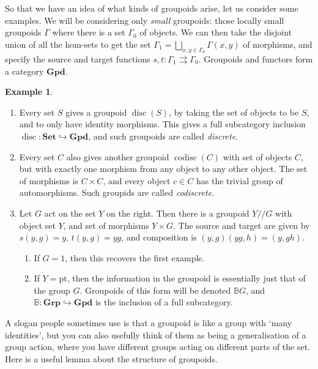 \documentclass{tufte-handout}
\def\into {\hookrightarrow}
\def\pt {\mathrm{pt}}
\def\Set {\mathbf{Set}}
\def\Grp {\mathbf{Grp}}
\def\Gpd {\mathbf{Gpd}}
\def\BB{\mathbb{B}}
\DeclareMathOperator{\disc}{disc}
\DeclareMathOperator{\codisc}{codisc}
\theoremstyle{definition}
\newtheorem{example}{Example}
\begin{document}
So that we have an idea of what kinds of groupoids arise, let us consider some examples. 
We will be considering only \emph{small} groupoids: those locally small groupoids 
$\Gamma$ where there is a set $\Gamma_0$ of objects. We can then take the disjoint union 
of all the hom-sets to get the set $\Gamma_1= \bigsqcup_{x,y\in \Gamma_0} \Gamma(x,y)$ of morphisms, and specify the source and 
target functions $s,t\colon \Gamma_1\rightrightarrows \Gamma_0$. Groupoids and functors 
form a category $\Gpd$.

\begin{example}
\begin{enumerate}
\item Every set $S$ gives a groupoid $\disc(S)$, by taking the set of objects to be $S$, and to only have identity
morphisms. This gives a full subcategory inclusion $\disc\colon \Set \into \Gpd$, and such groupoids are called \emph{discrete}.
\item Every set $C$ also gives another groupoid $\codisc(C)$ with set of objects $C$, but with exactly 
one morphism from any object to any other object. The set of morphisms is $C\times C$, and every 
object $c\in C$ has the trivial group of automorphisms. Such groupids are called \emph{codiscrete}.
\item Let $G$ act on the set $Y$ on the right. Then there is a groupoid $Y/\!/G$ with object set $Y$, and set of 
morphisms $Y\times G$. The source and target are given by $s(y,g)=y$, $t(y,g)=yg$, and composition is $(y,g)(yg,h) = (y,gh)$.
\begin{enumerate}
\item If $G=1$, then this recovers the first example.
\item If $Y=\pt$, then the information in the groupoid is essentially just that of the group $G$. Groupoids of this form will be denoted $\BB G$, and $\BB\colon \Grp \into \Gpd$ is the inclusion of a full subcategory.
\end{enumerate}
\end{enumerate}
\end{example}

A slogan people sometimes use is that a groupoid is like a group with `many identities', 
but you can also usefully think of them as being a generalisation of a group action, 
where you have different groups acting on different parts of the set. Here is a useful 
lemma about the structure of groupoids.
\end{document}
